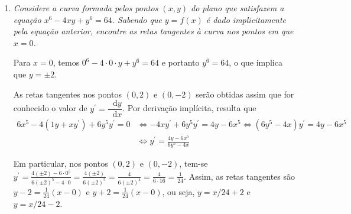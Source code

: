 \documentclass[12pt,a4paper]{article}
\newcommand*\diff{\mathop{}\!\mathrm{d}}
\begin{document}
\begin{enumerate}
\item \textit{Considere a curva formada pelos pontos $(x,y)$ do plano que satisfazem a equação $x^6 - 4x y + y^6 = 64$. Sabendo que $y = f(x)$ é dado implicitamente pela equação anterior, encontre as retas tangentes à curva nos pontos em que $x=0$.}

Para $x=0$, temos $0^6 - 4\cdot 0 \cdot y + y^6 = 64$ e portanto $y^6 = 64$, o que implica que $y = \pm 2$.

As retas tangentes nos pontos $(0,2)$ e $(0,-2)$ serão obtidas assim que for conhecido o valor de $y^\prime = \dfrac{ \diff{y} }{ \diff{x} }$. Por derivação implícita, resulta que
\begin{align*}
6x^5 - 4( 1 y + x y^\prime) + 6y^5 y^\prime = 0
& \Leftrightarrow -4x y^\prime + 6y^5 y^\prime = 4y - 6x^5
\Leftrightarrow (6y^5 - 4x) y^\prime = 4y - 6x^5 \\
& \Leftrightarrow y^\prime = \frac{ 4y - 6x^5 }{ 6y^5 - 4x }
\end{align*}

Em particular, nos pontos $(0,2)$ e $(0,-2)$, tem-se $y^\prime = \frac{ 4(\pm 2) - 6 \cdot 0^5 }{ 6(\pm 2)^5 - 4 \cdot 0 } = \frac{ 4 (\pm 2)}{6(\pm 2)^5} = \frac{ 4}{6(\pm 2)^4} = \frac{ 4}{6 \cdot 16} = \frac{1}{24}.$ Assim, as retas tangentes são $y-2 = \frac{1}{24}(x-0)$ e $y+2 = \frac{1}{24}(x-0)$, ou seja, $y = x/24+2$ e $y = x/24-2$.
\end{enumerate}
\end{document}
